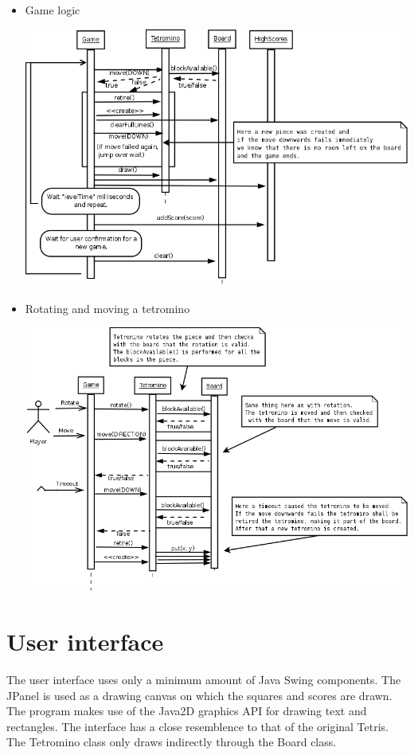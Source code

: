 \documentclass[11pt,a4paper]{article}
\begin{document}
\begin{itemize}
  \item Game logic
    \begin{center}
      \includegraphics[scale=0.30]{seq_game.png}
    \end{center}    

  \item Rotating and moving a tetromino
    \begin{center}
      \includegraphics[scale=0.35]{seq_tetro.png}
    \end{center}
\end{itemize}

\section {User interface}

The user interface uses only a minimum amount of Java Swing components. The JPanel is used as a drawing canvas
on which the squares and scores are drawn. The program makes use of the Java2D graphics API for drawing
text and rectangles. The interface has a close resemblence to that of the original Tetris. The
Tetromino class only draws indirectly through the Board class.
\end{document}
